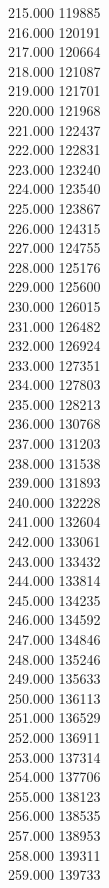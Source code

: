 { 215.000	119885 \\
 216.000	120191 \\
 217.000	120664 \\
 218.000	121087 \\
 219.000	121701 \\
 220.000	121968 \\
 221.000	122437 \\
 222.000	122831 \\
 223.000	123240 \\
 224.000	123540 \\
 225.000	123867 \\
 226.000	124315 \\
 227.000	124755 \\
 228.000	125176 \\
 229.000	125600 \\
 230.000	126015 \\
 231.000	126482 \\
 232.000	126924 \\
 233.000	127351 \\
 234.000	127803 \\
 235.000	128213 \\
 236.000	130768 \\
 237.000	131203 \\
 238.000	131538 \\
 239.000	131893 \\
 240.000	132228 \\
 241.000	132604 \\
 242.000	133061 \\
 243.000	133432 \\
 244.000	133814 \\
 245.000	134235 \\
 246.000	134592 \\
 247.000	134846 \\
 248.000	135246 \\
 249.000	135633 \\
 250.000	136113 \\
 251.000	136529 \\
 252.000	136911 \\
 253.000	137314 \\
 254.000	137706 \\
 255.000	138123 \\
 256.000	138535 \\
 257.000	138953 \\
 258.000	139311 \\
 259.000	139733 \\
}
